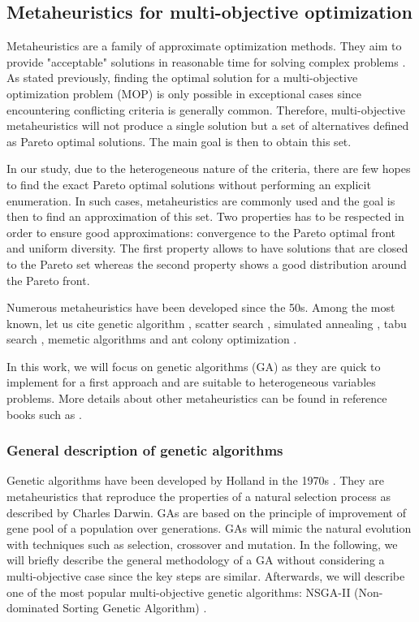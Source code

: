 \subsection{Metaheuristics for multi-objective optimization}
\label{subsec:metaheuristics}
Metaheuristics are a family of approximate optimization methods. They aim to provide "acceptable" solutions in reasonable time for solving complex problems \cite{talbi09}. As stated previously, finding the optimal solution for a multi-objective optimization problem (MOP) is only possible in exceptional cases since encountering conflicting criteria is generally common. Therefore, multi-objective metaheuristics will not produce a single solution but a set of alternatives defined as Pareto optimal solutions. The main goal is then to obtain this set.

In our study, due to the heterogeneous nature of the criteria, there are few hopes to find the exact Pareto optimal solutions without performing an explicit enumeration. In such cases, metaheuristics are commonly used and the goal is then to find an approximation of this set. Two properties has to be respected in order to ensure good approximations: convergence to the Pareto optimal front and uniform diversity. The first property allows to have solutions that are closed to the Pareto set whereas the second property shows a good distribution around the Pareto front.

Numerous metaheuristics have been developed since the 50s. Among the most known, let us cite genetic algorithm \cite{holland1975adaptation}, scatter search \cite{Glover77}, simulated annealing \cite{KirkpatrickGelattVecchi83}, tabu search \cite{Glover86}, memetic algorithms \cite{moscato89on} and ant colony optimization \cite{Dor92a.phd}.

In this work, we will focus on genetic algorithms (GA) as they are quick to implement for a first approach and are suitable to heterogeneous variables problems. More details about other metaheuristics can be found in reference books such as \cite{talbi09,dreo06metaheuristics,8125462}.

\subsubsection{General description of genetic algorithms}
Genetic algorithms have been developed by Holland in the 1970s \cite{holland1975adaptation}. They are metaheuristics that reproduce the properties of a natural selection process as described by Charles Darwin. GAs are based on the principle of improvement of gene pool of a population over generations. GAs will mimic the natural evolution with techniques such as selection, crossover and mutation. In the following, we will briefly describe the general methodology of a GA without considering a multi-objective case since the key steps are similar. Afterwards, we will describe one of the most popular multi-objective genetic algorithms: NSGA-II (Non-dominated Sorting Genetic Algorithm) \cite{Deb00afast}.


